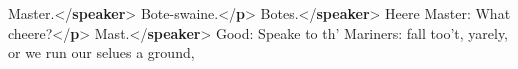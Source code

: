 \begin{shaded}
\hspace*{1em}\mbox{}\newline 
\hspace*{1em}\hspace*{1em}Master.{</\textbf{speaker}>}\mbox{}\newline 
\hspace*{1em}\hspace*{1em}Bote-swaine.{</\textbf{p}>}\mbox{}\newline 
\hspace*{1em}\mbox{}\newline 
\hspace*{1em}\mbox{}\newline 
\hspace*{1em}\hspace*{1em}Botes.{</\textbf{speaker}>}\mbox{}\newline 
\hspace*{1em}\hspace*{1em}Heere Master: What cheere?{</\textbf{p}>}\mbox{}\newline 
\hspace*{1em}\mbox{}\newline 
\hspace*{1em}\mbox{}\newline 
\hspace*{1em}\hspace*{1em}Mast.{</\textbf{speaker}>}\mbox{}\newline 
\hspace*{1em}\hspace*{1em}Good: Speake to th' Mariners: fall\mbox{}\newline 
\hspace*{1em}\hspace*{1em}\hspace*{1em}\hspace*{1em}\hspace*{1em}\hspace*{1em} too't, yarely, or we run our selues a ground,\mbox{}\newline 

\end{shaded}
